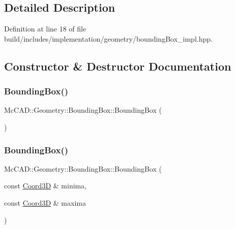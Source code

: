 \subsection{Detailed Description}


Definition at line 18 of file build/includes/implementation/geometry/bounding\+Box\+\_\+impl.\+hpp.



\subsection{Constructor \& Destructor Documentation}
\mbox{\label{classMcCAD_1_1Geometry_1_1BoundingBox_aa9d7c831f4053d6eff0e2c484a2a0c92}} 
\subsubsection{\texorpdfstring{Bounding\+Box()}{BoundingBox()}\hspace{0.1cm}{\footnotesize\ttfamily [1/4]}}
{\footnotesize\ttfamily Mc\+C\+A\+D\+::\+Geometry\+::\+Bounding\+Box\+::\+Bounding\+Box (\begin{DoxyParamCaption}{ }\end{DoxyParamCaption})\hspace{0.3cm}{\ttfamily [default]}}

\mbox{\label{classMcCAD_1_1Geometry_1_1BoundingBox_a7ed4eaad9315ad7414c2518ef49e2af5}} 
\subsubsection{\texorpdfstring{Bounding\+Box()}{BoundingBox()}\hspace{0.1cm}{\footnotesize\ttfamily [2/4]}}
{\footnotesize\ttfamily Mc\+C\+A\+D\+::\+Geometry\+::\+Bounding\+Box\+::\+Bounding\+Box (\begin{DoxyParamCaption}\item[{const \hyperlink{classMcCAD_1_1Geometry_1_1Coord3D}{Coord3D} \&}]{minima,  }\item[{const \hyperlink{classMcCAD_1_1Geometry_1_1Coord3D}{Coord3D} \&}]{maxima }\end{DoxyParamCaption})}



